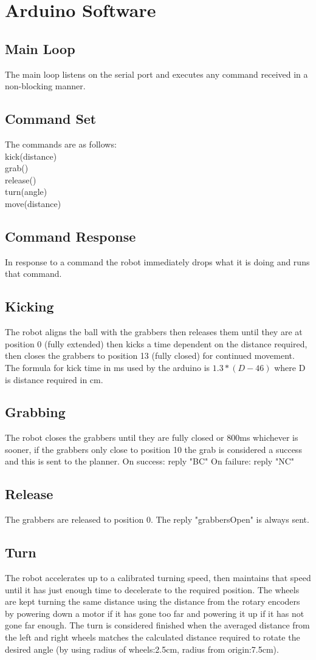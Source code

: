 
\section{Arduino Software}
\subsection{Main Loop}
The main loop listens on the serial port and executes any command received in a non-blocking manner. 
\subsection{Command Set}
The commands are as follows:\\
kick(distance)\\
grab()\\
release()\\
turn(angle)\\
move(distance)\\
\subsection{Command Response}
In response to a command the robot immediately drops what it is doing and runs that command. 
\subsection{Kicking}
The robot aligns the ball with the grabbers then releases them until they are at position 0 (fully extended) then kicks a time dependent on the distance required, then closes the grabbers to position 13 (fully closed) for continued movement. The formula for kick time in ms used by the arduino is $ 1.3*(D-46) $ where D is distance required in cm. 
\subsection{Grabbing}
The robot closes the grabbers until they are fully closed or 800ms whichever is sooner, if the grabbers only close to position 10 the grab is considered a success and this is sent to the planner. 
On success: reply "BC"
On failure: reply "NC"
\subsection{Release}
The grabbers are released to position 0. The reply "grabbersOpen" is always sent. 
\subsection{Turn}
The robot accelerates up to a calibrated turning speed, then maintains that speed until it has just enough time to decelerate to the required position. The wheels are kept turning the same distance using the distance from the rotary encoders by powering down a motor if it has gone too far and powering it up if it has not gone far enough. The turn is considered finished when the averaged distance from the left and right wheels matches the calculated distance required to rotate the desired angle (by using radius of wheels:2.5cm, radius from origin:7.5cm). 
